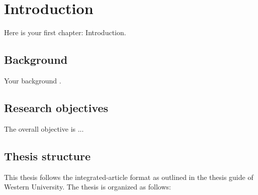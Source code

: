 \chapter{Introduction}
\label{chap: intro}

\begin{refsection}

Here is your first chapter: Introduction.

\section{Background}
Your background \autocite{deng2017volumetric}.

\section{Research objectives}
The overall objective is ...


\section{Thesis structure}
This thesis follows the integrated-article format as outlined in the thesis guide of Western University. The thesis is organized as follows:

\pagebreak
{}

\begin{spacing}{1.1}
    \printbibliography[heading=subbibliography]
\end{spacing}
\end{refsection}
